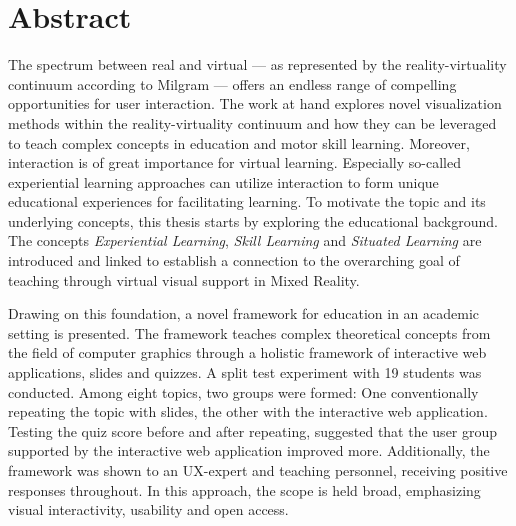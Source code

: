 %





\chapter*{Abstract}
\label{sec:abstract}
\vspace*{-10mm}

The spectrum between real and virtual --- as represented by the reality-virtuality continuum according to Milgram --- offers an endless range of compelling opportunities for user interaction.
The work at hand explores novel visualization methods within the reality-virtuality continuum and how they can be leveraged to teach complex concepts in education and motor skill learning.
Moreover, interaction is of great importance for virtual learning.
Especially so-called experiential learning approaches can utilize interaction to form unique educational experiences for facilitating learning.
To motivate the topic and its underlying concepts, this thesis starts by exploring the educational background.
The concepts \emph{Experiential Learning}, \emph{Skill Learning} and \emph{Situated Learning} are introduced and linked to establish a connection to the overarching goal of teaching through virtual visual support in Mixed Reality.

Drawing on this foundation, a novel framework for education in an academic setting is presented.
The framework teaches complex theoretical concepts from the field of computer graphics through a holistic framework of interactive web applications, slides and quizzes.
A split test experiment with 19 students was conducted.
Among eight topics, two groups were formed: One conventionally repeating the topic with slides, the other with the interactive web application.
Testing the quiz score before and after repeating, suggested that the user group supported by the interactive web application improved more.
Additionally, the framework was shown to an UX-expert and teaching personnel, receiving positive responses throughout.
In this approach, the scope is held broad, emphasizing visual interactivity, usability and open access.

